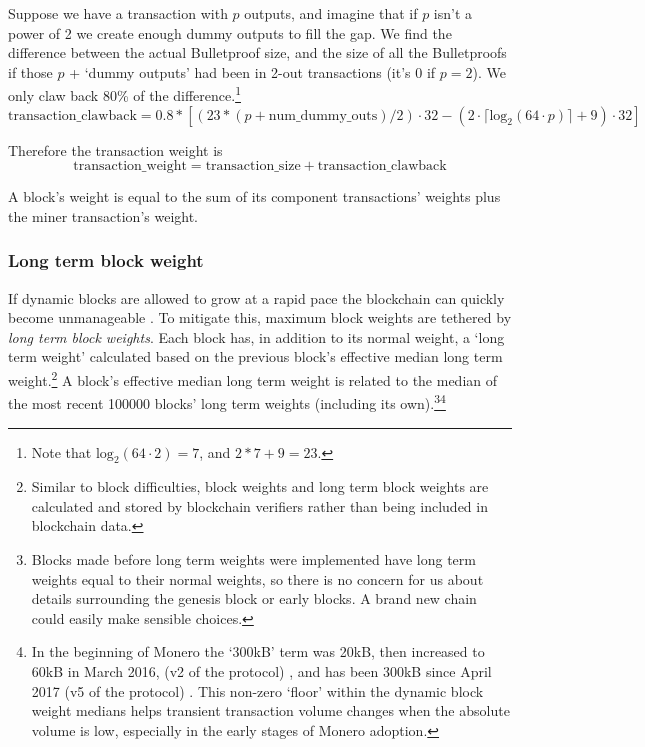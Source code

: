 Suppose we have a transaction with $p$ outputs, and imagine that if $p$ isn't a power of 2 we create enough dummy outputs to fill the gap. We find the difference between the actual Bulletproof size, and the size of all the Bulletproofs if those $p$ + `dummy outputs' had been in 2-out transactions (it's 0 if $p = 2$). We only claw back 80\% of the difference.\footnote{Note that $\textrm{log}_2(64 \cdot 2) = 7$, and $2*7 + 9 = 23$.}\vspace{.175cm}
\[\textrm{transaction\_clawback} = 0.8*[(23*(p + \textrm{num\_dummy\_outs})/2) \cdot 32 - (2 \cdot \lceil \textrm{log}_2(64 \cdot p) \rceil + 9) \cdot 32]\]

Therefore the transaction weight is\vspace{.175cm}
\[\textrm{transaction\_weight} = \textrm{transaction\_size} + \textrm{transaction\_clawback}\]

A block's weight is equal to the sum of its component transactions' weights plus the miner transaction's weight.

\subsubsection*{Long term block weight}

If dynamic blocks are allowed to grow at a rapid pace the blockchain can quickly become unmanageable \cite{big-bang-github}. To mitigate this, maximum block weights are tethered by {\em long term block weights}. Each block has, in addition to its normal weight, a `long term weight' calculated based on the previous block's effective median long term weight.\footnote{Similar to block difficulties, block weights and long term block weights are calculated and stored by blockchain verifiers rather than being included in blockchain data.} A block's effective median long term weight is related to the median of the most recent 100000 blocks' long term weights (including its own).\footnote{Blocks made before long term weights were implemented have long term weights equal to their normal weights, so there is no concern for us about details surrounding the genesis block or early blocks. A brand new chain could easily make sensible choices.}\footnote{In the beginning of Monero the `300kB' term was 20kB, then increased to 60kB in March 2016, (v2 of the protocol) \cite{monero-0.9.3}, and has been 300kB since April 2017 (v5 of the protocol) \cite{monero-v5}. This non-zero `floor' within the dynamic block weight medians helps transient transaction volume changes when the absolute volume is low, especially in the early stages of Monero adoption.}%

